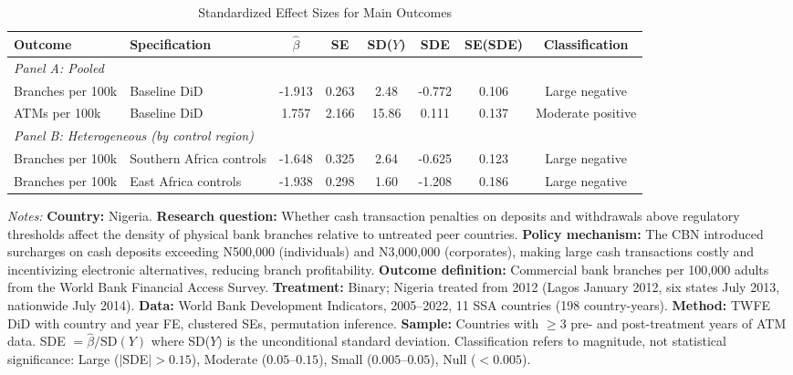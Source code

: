 \begin{table}[H]
\centering
\caption{Standardized Effect Sizes for Main Outcomes}
\label{tab:sde}
\begin{threeparttable}
\scriptsize
\begin{tabular}{llcccccc}
\toprule
Outcome & Specification & $\hat{\beta}$ & SE & SD($Y$) & SDE & SE(SDE) & Classification \\
\midrule
\multicolumn{8}{l}{\textit{Panel A: Pooled}} \\
Branches per 100k & Baseline DiD & -1.913 & 0.263 & 2.48 & -0.772 & 0.106 & Large negative \\
ATMs per 100k & Baseline DiD & 1.757 & 2.166 & 15.86 & 0.111 & 0.137 & Moderate positive \\
\midrule
\multicolumn{8}{l}{\textit{Panel B: Heterogeneous (by control region)}} \\
Branches per 100k & Southern Africa controls & -1.648 & 0.325 & 2.64 & -0.625 & 0.123 & Large negative \\
Branches per 100k & East Africa controls & -1.938 & 0.298 & 1.60 & -1.208 & 0.186 & Large negative \\
\bottomrule
\end{tabular}
\begin{tablenotes}[flushleft]
\footnotesize\raggedright
\item \textit{Notes:}
\textbf{Country:} Nigeria.
\textbf{Research question:} Whether cash transaction penalties on deposits and withdrawals above regulatory thresholds affect the density of physical bank branches relative to untreated peer countries.
\textbf{Policy mechanism:} The CBN introduced surcharges on cash deposits exceeding N500,000 (individuals) and N3,000,000 (corporates), making large cash transactions costly and incentivizing electronic alternatives, reducing branch profitability.
\textbf{Outcome definition:} Commercial bank branches per 100,000 adults from the World Bank Financial Access Survey.
\textbf{Treatment:} Binary; Nigeria treated from 2012 (Lagos January 2012, six states July 2013, nationwide July 2014).
\textbf{Data:} World Bank Development Indicators, 2005--2022, 11 SSA countries (198 country-years).
\textbf{Method:} TWFE DiD with country and year FE, clustered SEs, permutation inference.
\textbf{Sample:} Countries with $\geq$3 pre- and post-treatment years of ATM data.
SDE $= \hat{\beta} / \text{SD}(Y)$ where SD($Y$) is the unconditional standard deviation.
Classification refers to magnitude, not statistical significance:
Large ($|$SDE$| > 0.15$), Moderate ($0.05$--$0.15$), Small ($0.005$--$0.05$), Null ($< 0.005$). 
\end{tablenotes}
\end{threeparttable}
\end{table}
